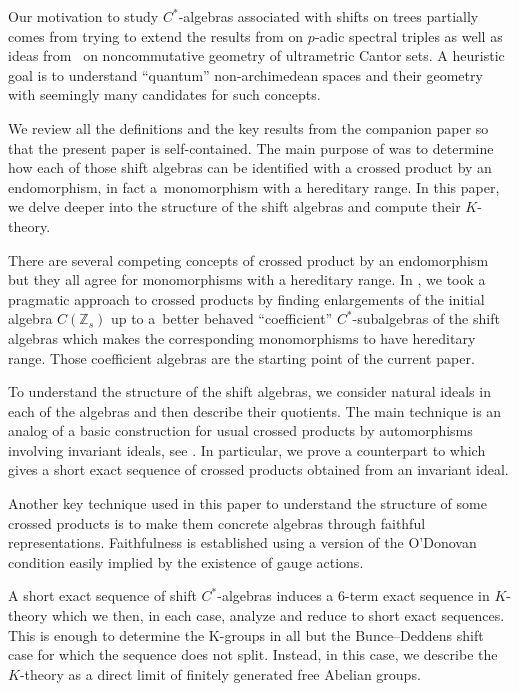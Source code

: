 \documentclass[pdftex]{sigma}
\newcommand{\Z}{{\mathbb Z}}
\numberwithin{equation}{section}
\begin{document}
Our motivation to study $C^*$-algebras associated with shifts on trees partially comes from trying to extend the results from \cite{KMR, KRS1, KRS2} on $p$-adic spectral triples as well as ideas from~\cite{PB} on noncommutative geometry of ultrametric Cantor sets. A heuristic goal is to understand ``quantum'' non-archimedean spaces and their geometry with seemingly many candidates for such concepts.

We review all the definitions and the key results from the companion paper \cite{HKMP3} so that the present paper is self-contained. The main purpose of \cite{HKMP3} was to determine how each of those shift algebras can be identified with a crossed product by an endomorphism, in fact a~monomorphism with a hereditary range. In this paper, we delve deeper into the structure of the shift algebras and compute their $K$-theory.

There are several competing concepts of crossed product by an endomorphism \cite{ABL,BKR,E,Mu,St} but they all agree for monomorphisms with a hereditary range. In \cite{HKMP3}, we took a pragmatic approach to crossed products by finding enlargements of the initial algebra $C(\Z_s)$ up to a~better behaved ``coefficient'' $C^*$-subalgebras of the shift algebras which makes the corresponding monomorphisms to have hereditary range. Those coefficient algebras are the starting point of the current paper.

To understand the structure of the shift algebras, we consider natural ideals in each of the algebras and then describe their quotients. The main technique is an analog of a basic construction for usual crossed products by automorphisms involving invariant ideals, see \cite[Section~3.4]{Williams}. In particular, we prove a counterpart to \cite[Proposition 3.19]{Williams} which gives a short exact sequence of crossed products obtained from an invariant ideal.

Another key technique used in this paper to understand the structure of some crossed products is to make them concrete algebras through faithful representations. Faithfulness is established using a version of the O'Donovan condition easily implied by the existence of gauge actions.

A short exact sequence of shift $C^*$-algebras induces a $6$-term exact sequence in $K$-theory which we then, in each case, analyze and reduce to short exact sequences. This is enough to determine the K-groups in all but the Bunce--Deddens shift case for which the sequence does not split. Instead, in this case, we describe the $K$-theory as a direct limit of finitely generated free Abelian groups.
\end{document}
